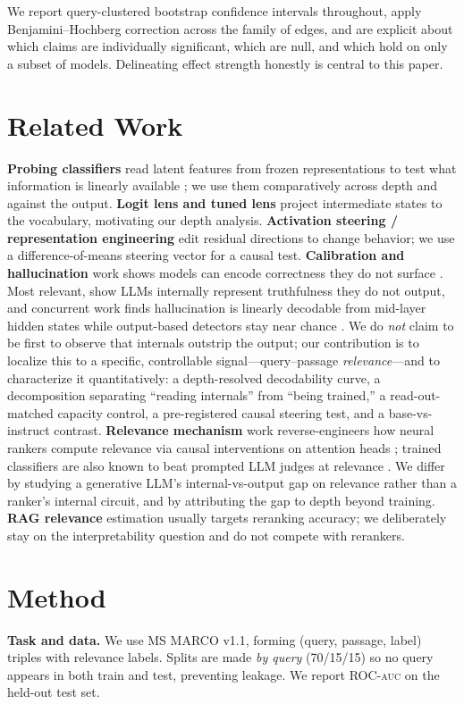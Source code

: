 \documentclass[11pt]{article}
\newcommand{\auc}{\textsc{auc}}
\begin{document}
We report query-clustered bootstrap confidence intervals throughout, apply
Benjamini--Hochberg correction across the family of edges, and are explicit
about which claims are individually significant, which are null, and which
hold on only a subset of models. Delineating effect strength honestly is
central to this paper.

\section{Related Work}
\textbf{Probing classifiers} read latent features from frozen representations
to test what information is linearly available \citep{alain2017,hewitt2019};
we use them comparatively across depth and against the output.
\textbf{Logit lens and tuned lens} \citep{nostalgebraist2020,belrose2023}
project intermediate states to the vocabulary, motivating our depth analysis.
\textbf{Activation steering / representation engineering}
\citep{turner2023,zou2023,li2023iti} edit residual directions to change
behavior; we use a difference-of-means steering vector for a causal test.
\textbf{Calibration and hallucination} work shows models can encode
correctness they do not surface \citep{kadavath2022,azaria2023,burns2022}.
Most relevant, \citet{orgad2024} show LLMs internally represent truthfulness
they do not output, and concurrent work finds hallucination is linearly
decodable from mid-layer hidden states while output-based detectors stay near
chance \citep{aiersilan2026}. We do \emph{not} claim to be first to observe
that internals outstrip the output; our contribution is to localize this to a
specific, controllable signal---query--passage \emph{relevance}---and to
characterize it quantitatively: a depth-resolved decodability curve, a
decomposition separating ``reading internals'' from ``being trained,'' a
read-out-matched capacity control, a pre-registered causal steering test, and a
base-vs-instruct contrast. \textbf{Relevance mechanism}
work reverse-engineers how neural rankers compute relevance via causal
interventions on attention heads \citep{chen2024relevance}; trained classifiers
are also known to beat prompted LLM judges at relevance \citep{gienapp2025}. We
differ by studying a generative LLM's internal-vs-output gap on relevance rather
than a ranker's internal circuit, and by attributing the gap to depth beyond
training. \textbf{RAG relevance} estimation usually targets reranking accuracy;
we deliberately stay on the interpretability question and do not compete with
rerankers.

\section{Method}
\label{sec:method}
\textbf{Task and data.} We use MS MARCO v1.1, forming (query, passage, label)
triples with relevance labels. Splits are made \emph{by query} (70/15/15) so
no query appears in both train and test, preventing leakage. We report
ROC-\auc{} on the held-out test set.
\end{document}

